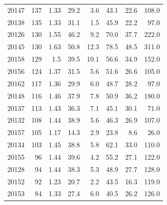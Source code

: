 \begin{table}[ht]
{\begin{tabular}{lrrrrrrr}
20147 & 137 & 1.33 & 29.2 & 3.6 & 43.1 & 22.6 & 108.0 \\
20138 & 135 & 1.33 & 31.1 & 1.5 & 45.9 & 22.2 & 97.0 \\
20126 & 130 & 1.55 & 46.2 & 9.2 & 70.0 & 37.7 & 222.0 \\
20145 & 130 & 1.63 & 50.8 & 12.3 & 78.5 & 48.5 & 311.0 \\
20158 & 129 & 1.5 & 39.5 & 10.1 & 56.6 & 34.9 & 152.0 \\
20156 & 124 & 1.37 & 31.5 & 5.6 & 51.6 & 26.6 & 105.0 \\
20162 & 117 & 1.36 & 29.9 & 6.0 & 48.7 & 28.2 & 97.0 \\
20148 & 116 & 1.46 & 37.9 & 7.8 & 50.9 & 36.2 & 180.0 \\
20137 & 113 & 1.43 & 36.3 & 7.1 & 45.1 & 30.1 & 71.0 \\
20132 & 108 & 1.44 & 38.9 & 5.6 & 46.3 & 26.9 & 107.0 \\
20157 & 105 & 1.17 & 14.3 & 2.9 & 23.8 & 8.6 & 26.0 \\
20134 & 103 & 1.45 & 38.8 & 5.8 & 62.1 & 33.0 & 110.0 \\
20155 & 96 & 1.44 & 39.6 & 4.2 & 55.2 & 27.1 & 122.0 \\
20128 & 94 & 1.44 & 38.3 & 5.3 & 48.9 & 27.7 & 128.0 \\
20152 & 92 & 1.23 & 20.7 & 2.2 & 43.5 & 16.3 & 119.0 \\
20153 & 84 & 1.33 & 27.4 & 6.0 & 40.5 & 26.2 & 126.0 \\
\bottomrule
\end{tabular}
}
\end{table}
